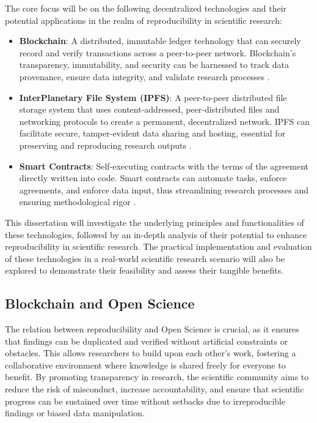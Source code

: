The core focus will be on the following decentralized technologies and their potential applications in the realm of reproducibility in scientific research:

\begin{itemize}
    \item \textbf{Blockchain}: A distributed, immutable ledger technology that can securely record and verify transactions across a peer-to-peer network. Blockchain's transparency, immutability, and security can be harnessed to track data provenance, ensure data integrity, and validate research processes \cite{christidis2016blockchain}.

    \item \textbf{InterPlanetary File System (IPFS)}: A peer-to-peer distributed file storage system that uses content-addressed, peer-distributed files and networking protocols to create a permanent, decentralized network. IPFS can facilitate secure, tamper-evident data sharing and hosting, essential for preserving and reproducing research outputs \cite{benet2014ipfs}.

    \item \textbf{Smart Contracts}: Self-executing contracts with the terms of the agreement directly written into code. Smart contracts can automate tasks, enforce agreements, and enforce data input, thus streamlining research processes and ensuring methodological rigor \cite{buterin2014ethereum}.
\end{itemize}

This dissertation will investigate the underlying principles and functionalities of these technologies, followed by an in-depth analysis of their potential to enhance reproducibility in scientific research. The practical implementation and evaluation of these technologies in a real-world scientific research scenario will also be explored to demonstrate their feasibility and assess their tangible benefits.


\subsection{Blockchain and Open Science}

The relation between reproducibility and Open Science is crucial, as it ensures that findings can be duplicated and verified without artificial constraints or obstacles. This allows researchers to build upon each other's work, fostering a collaborative environment where knowledge is shared freely for everyone to benefit. By promoting transparency in research, the scientific community aims to reduce the risk of misconduct, increase accountability, and ensure that scientific progress can be sustained over time without setbacks due to irreproducible findings or biased data manipulation.

